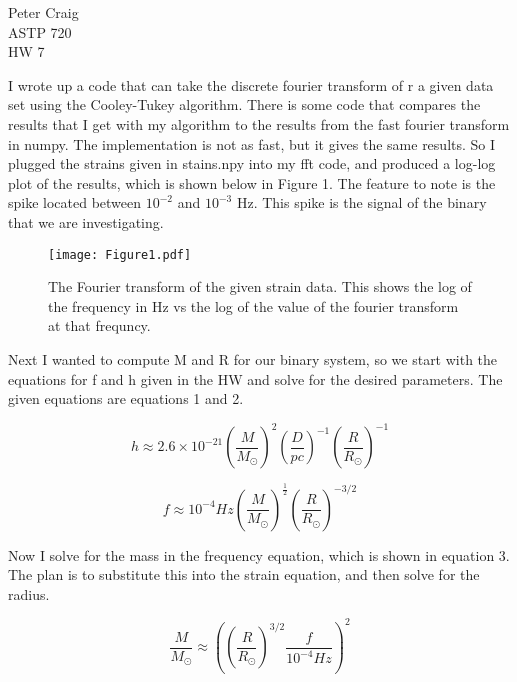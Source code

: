 \documentclass{article}
\begin{document}
\begin{flushleft}
Peter Craig\\
ASTP 720\\
HW 7\\
\end{flushleft}

I wrote up a code that can take the discrete fourier transform of r a given data set using the Cooley-Tukey algorithm. There is some code that compares the results that I get with my algorithm to the results from the fast fourier transform in numpy. The implementation is not as fast, but it gives the same results. So I plugged the strains given in stains.npy into my fft code, and produced a log-log plot of the results, which is shown below in Figure 1. The feature to note is the spike located between $10^{-2}$ and $10^{-3}$ Hz. This spike is the signal of the binary that we are investigating.

\begin{figure}[H]\label{f1}
  \begin{center}
  \texttt{[image: Figure1.pdf]}
  \caption{The Fourier transform of the given strain data. This shows the log of the frequency in Hz vs the log of the value of the fourier transform at that frequncy.}
  \end{center}
\end{figure}

Next I wanted to compute M and R for our binary system, so we start with the equations for f and h given in the HW and solve for the desired parameters. The given equations are equations 1 and 2.


\begin{equation}\label{h}
h \approx 2.6 \times 10^{-21} (\frac{M}{M_\odot})^2 (\frac{D}{pc}) ^{-1}(\frac{R}{R_\odot})^{-1}
\end{equation}

\begin{equation}\label{freq}
f \approx 10^{-4} Hz  (\frac{M}{M_\odot})^\frac{1}{2} (\frac{R}{R_\odot})^{-3/2}
\end{equation}

Now I solve for the mass in the frequency equation, which is shown in equation 3. The plan is to substitute this into the strain equation, and then solve for the radius.

\begin{equation}\label{Mass}
  \frac{M}{M_\odot} \approx  ( (\frac{R}{R_\odot})^{3/2} \frac{f}{10^{-4} Hz})^2 
\end{equation}
\end{document}
